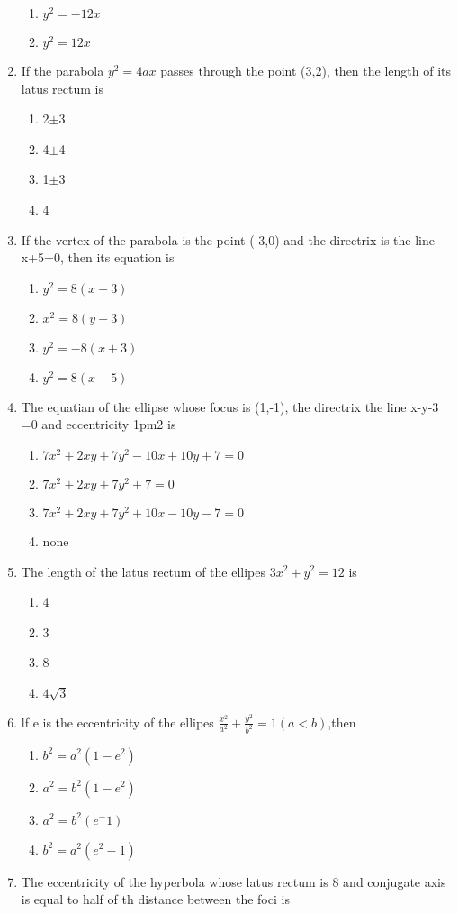 \documentclass[12pt]{article}
\begin{document}
\begin{enumerate}[resume]
\begin{enumerate}
\item $y^2=-12x$
\item $y^2=12x$
\end{enumerate}
\item If the parabola $y^2=4ax$ passes through the point (3,2), then the length of its latus rectum is
\begin{enumerate}
\item 2$\pm$3
\item 4$\pm$4
\item 1$\pm$3
\item 4
\end{enumerate}
\item If the vertex of the parabola is the point (-3,0) and the directrix is the line x+5=0, then its equation is
\begin{enumerate}
\item $y^2=8(x+3)$
\item $x^2=8(y+3)$
\item $y^2=-8(x+3)$
\item $y^2=8(x+5)$
\end{enumerate}
\item The equatian of the ellipse whose focus is (1,-1), the directrix the line x-y-3
=0 and eccentricity 1pm2 is
\begin{enumerate}
\item $7x^2+2xy+7y^2-10x+10y+7=0$
\item $7x^2+2xy+7y^2+7=0$
\item $7x^2+2xy+7y^2+10x-10y-7=0$ 
\item none
\end{enumerate}
\item The length of the latus rectum of the ellipes $3x^2+y^2=12$ is
\begin{enumerate}
\item 4
\item 3
\item 8
\item $4\sqrt{3}$
\end{enumerate}
\item lf e is the eccentricity of the ellipes $\frac{x^2}{a^2}+\frac{y^2}{b^2}=1(a<b)$,then
\begin{enumerate}
\item $b^2=a^2(1-e^2)$
\item $a^2=b^2(1-e^2)$
\item $a^2=b^2(e^-1)$
\item $b^2=a^2(e^2-1)$
\end{enumerate}
\item The eccentricity of the hyperbola whose latus rectum is 8 and conjugate axis is equal to half of th distance between the foci is 

\end{enumerate}
\end{document}
